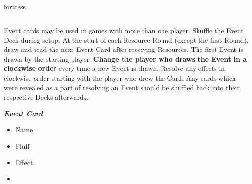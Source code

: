 \begin{multicols*}{2}
\vspace*{1em}
\begin{expansion}[before=\vspace*{-11mm}]{fortress}
  \subsection*{}
  Event cards may be used in games with more than one player.
  Shuffle the Event Deck during setup.
  At the start of each Resource Round (except the first Round), draw and read the next Event Card after receiving Resources.
  The first Event is drawn by the starting player.
  \textbf{Change the player who draws the Event in a clockwise order} every time a new Event is drawn.
  Resolve any effects in clockwise order starting with the player who drew the Card.
  Any cards which were revealed as a part of resolving an Event should be shuffled back into their respective Decks afterwards.
  
  \medskip

  \begin{minipage}[h]{\linewidth}
    \vspace{0.1pt}
    \centering
    \begin{scriptsize}
    \end{scriptsize}
    \footnotesize
    \textbf{\textit{\textcolor{darkcandyapplered}{Event Card}}}
    \begin{multicols}{2}
      \begin{itemize}
        \item[\textbf{1.}] Name
        \item[\textbf{2.}] Fluff
        \item[\textbf{3.}] Effect
        \item[\textbf{\phantom{.}}] \phantom{.}
      \end{itemize}
    \end{multicols}
  \end{minipage}
\end{expansion}


\end{multicols*}
